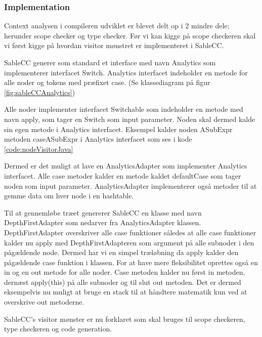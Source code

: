 \subsubsection{Implementation}
Context analysen i compileren udviklet er blevet delt op i 2 mindre dele; herunder scope checker og type checker. Før vi kan kigge på scope checkeren skal vi først kigge på hvordan visitor mønstret er implementeret i SableCC.

\label{sct:visitorSableCC}
SableCC generer som standard et interface med navn Analytics som implementerer interfacet Switch. Analytics interfacet indeholder en metode for alle noder og tokens med præfixet case. (Se klassediagram på figur \ref{fig:sableCCAnalytics})

Alle noder implementer interfacet Switchable som indeholder en metode med navn apply, som tager en Switch som input parameter. Noden skal dermed kalde sin egen metode i Analytics interfacet. Eksempel kalder noden ASubExpr metoden caseASubExpr i Analytics interfacet som ses i kode \ref{code:nodeVisitorJava}


Dermed er det muligt at lave en AnalyticsAdapter som implementer Analytics interfacet. Alle case metoder kalder en metode kaldet defaultCase som tager noden som input parameter. AnalyticsAdapter implementerer også metoder til at gemme data om hver node i en hashtable. 

Til at gennemløbe træet genererer SableCC en klasse med navn DepthFirstAdapter som nedarver fra AnalyticsAdapter klassen. DepthFirstAdapter overskriver alle case funktioner således at alle case funktioner kalder nu apply med DepthFirstAdapteren som argument på alle subnoder i den pågældende node. Dermed har vi en simpel træløbning da apply kalder den pågældende case funktion i klassen. For at have mere fleksibilitet oprettes også en in og en out metode for alle noder. Case metoden kalder nu først in metoden, dernæst apply(this) på alle subnoder og til slut out metoden. Det er dermed eksempelvis nu muligt at bruge en stack til at håndtere matematik kun ved at overskrive out metoderne.


SableCC's visitor mønster er nu forklaret som skal bruges til scope checkeren, type checkeren og code generation.

